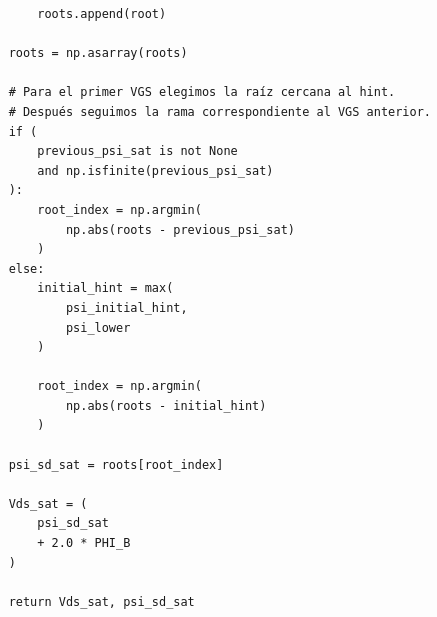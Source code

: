 \documentclass[a4paper, twoside, 10pt, spanish]{article}
\numberwithin{table}{section}
\begin{document}
\begin{verbatim}
        roots.append(root)

    roots = np.asarray(roots)

    # Para el primer VGS elegimos la raíz cercana al hint.
    # Después seguimos la rama correspondiente al VGS anterior.
    if (
        previous_psi_sat is not None
        and np.isfinite(previous_psi_sat)
    ):
        root_index = np.argmin(
            np.abs(roots - previous_psi_sat)
        )
    else:
        initial_hint = max(
            psi_initial_hint,
            psi_lower
        )

        root_index = np.argmin(
            np.abs(roots - initial_hint)
        )

    psi_sd_sat = roots[root_index]

    Vds_sat = (
        psi_sd_sat
        + 2.0 * PHI_B
    )

    return Vds_sat, psi_sd_sat
\end{verbatim}
\end{document}
